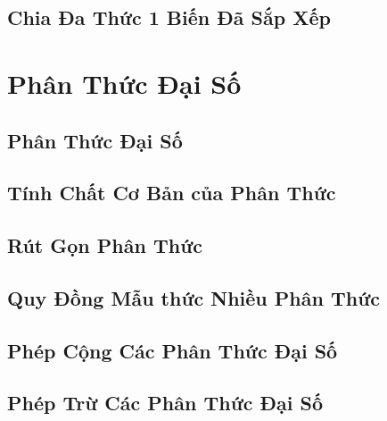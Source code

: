 \documentclass{article}
\numberwithin{equation}{section}
\begin{document}
\subsection{Chia Đa Thức 1 Biến Đã Sắp Xếp}


\section{Phân Thức Đại Số}

\subsection{Phân Thức Đại Số}


\subsection{Tính Chất Cơ Bản của Phân Thức}


\subsection{Rút Gọn Phân Thức}


\subsection{Quy Đồng Mẫu thức Nhiều Phân Thức}


\subsection{Phép Cộng Các Phân Thức Đại Số}


\subsection{Phép Trừ Các Phân Thức Đại Số}
\end{document}
